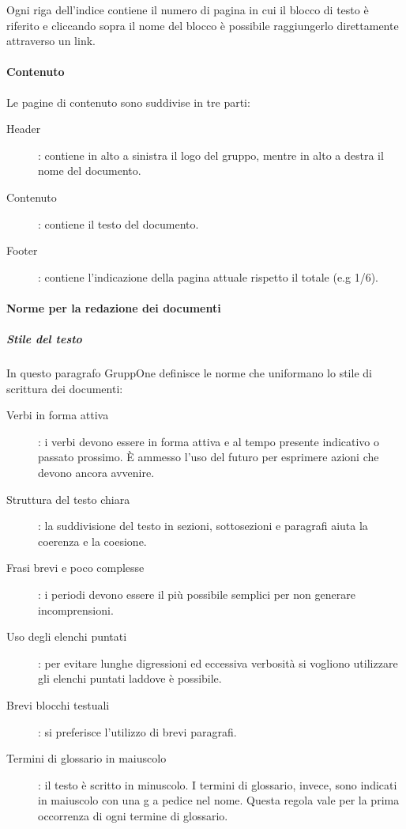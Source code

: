 \documentclass[../norme-di-progetto.tex]{subfiles}
\begin{document}
Ogni riga dell'indice contiene il numero di pagina in cui il blocco di testo è riferito e cliccando sopra il nome del blocco è possibile raggiungerlo direttamente attraverso un link.

\paragraph{Contenuto}%
\label{par:contenuto}
Le pagine di contenuto sono suddivise in tre parti:
\begin{description}
  \item [Header]: contiene in alto a sinistra il logo del gruppo, mentre in alto a destra il nome del documento.
  \item [Contenuto]: contiene il testo del documento.
  \item [Footer]: contiene l'indicazione della pagina attuale rispetto il totale (e.g 1/6).
\end{description}

\paragraph{Norme per la redazione dei documenti}%
\label{par:norme_per_la_redazione_dei_documenti}

\subparagraph{Stile del testo}%
\label{subp:stile_del_testo}
In questo paragrafo GruppOne definisce le norme che uniformano lo stile di scrittura dei documenti:
\begin{description}
  \item [Verbi in forma attiva]: i verbi devono essere in forma attiva e al tempo presente indicativo o passato prossimo. È ammesso l'uso del futuro per esprimere azioni che devono ancora avvenire.
  \item [Struttura del testo chiara]: la suddivisione del testo in sezioni, sottosezioni e paragrafi aiuta la coerenza e la coesione.
  \item [Frasi brevi e poco complesse]: i periodi devono essere il più possibile semplici per non generare incomprensioni.
  \item [Uso degli elenchi puntati]: per evitare lunghe digressioni ed eccessiva verbosità si vogliono utilizzare gli elenchi puntati laddove è possibile.
  \item [Brevi blocchi testuali]: si preferisce l'utilizzo di brevi paragrafi.
  \item [Termini di glossario in maiuscolo]: il testo è scritto in minuscolo. I termini di glossario, invece, sono indicati in maiuscolo con una g a pedice nel nome. Questa regola vale per la prima occorrenza di ogni termine di glossario.
\end{description}
\end{document}
